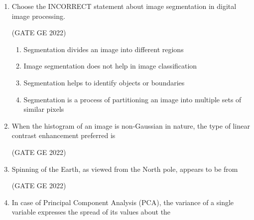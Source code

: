 \documentclass[journal,12pt,onecolumn]{IEEEtran}
\theoremstyle{remark}
\begin{document}
\begin{enumerate}
\item Choose the INCORRECT statement about image segmentation in digital image processing.

\hfill (GATE GE 2022)

\begin{enumerate}
    \item Segmentation divides an image into different regions
    \item Image segmentation does not help in image classification
    \item Segmentation helps to identify objects or boundaries
    \item Segmentation is a process of partitioning an image into multiple sets of similar pixels
\end{enumerate}

\item When the histogram of an image is non-Gaussian in nature, the type of linear contrast enhancement preferred is

\hfill (GATE GE 2022)

\begin{enumerate}
\end{enumerate}

\item Spinning of the Earth, as viewed from the North pole, appears to be from

\hfill (GATE GE 2022)

\begin{enumerate}
\end{enumerate}

\item In case of Principal Component Analysis (PCA), the variance of a single variable expresses the spread of its values about the


\end{enumerate}
\end{document}
